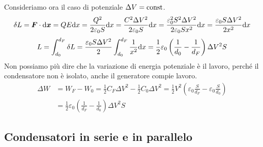 \begin{Es}
Consideriamo ora il caso di potenziale $\Delta V=\text{const}$.
\begin{equation*}\delta L=\boldsymbol{F}\cdot\mathrm{d} \boldsymbol{x}=QE\mathrm{d} x=\frac{Q^2}{2\varepsilon_0S}\mathrm{d} x=\frac{C^2\Delta V^2}{2\varepsilon_0S}\mathrm{d} x=\frac{\varepsilon_0^2S^2\Delta V^2}{2\varepsilon_0Sx^2}\mathrm{d} x=\frac{\varepsilon_0S\Delta V^2}{2x^2}\mathrm{d} x\end{equation*}
\begin{equation*}L=\int_{d_0}^{d_F}\delta L=\frac{\varepsilon_0S\Delta V^2}{2}\int_{d_0}^{d_F}\frac{1}{x^2}\mathrm{d} x=\frac{1}{2}\varepsilon_0\left(\frac{1}{d_0}-\frac{1}{d_F}\right)\Delta V^2S\end{equation*}
Non possiamo più dire che la variazione di energia potenziale è il lavoro, perché il condensatore non è isolato, anche il generatore compie lavoro.
\begin{align*}
\Delta W&=W_F-W_0=\frac{1}{2}C_F\Delta V^2-\frac{1}{2}C_0\Delta V^2=\frac{1}{2}V^2\left(\varepsilon_0\frac{S}{d_F}-\varepsilon_0\frac{S}{d_0}\right)\\
&=\frac{1}{2}\varepsilon_0\left(\frac{1}{d_F}-\frac{1}{d_0}\right)\Delta V^2S
\end{align*}
\end{Es}
\subsection{Condensatori in serie e in parallelo}
